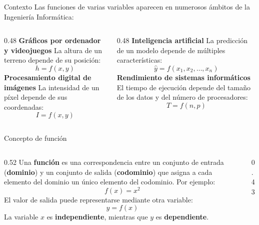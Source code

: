 \documentclass[main.tex]{subfiles}
\begin{document}
\graphicspath{{imagenes/tema1/}{../imagenes/tema1/}}






\begin{frame}{Contexto}
Las funciones de varias variables aparecen en numerosos ámbitos de la Ingeniería Informática:
\vspace{0.4cm}
\begin{columns}[T]
\begin{column}{0.48\textwidth}
\textbf{Gráficos por ordenador y videojuegos}
La altura de un terreno depende de su posición:
\[h=f(x,y)\]
\vspace{0.4cm}
\textbf{Procesamiento digital de imágenes}
La intensidad de un píxel depende de sus coordenadas:
\[I=f(x,y)\]
\end{column}
\begin{column}{0.48\textwidth}
\textbf{Inteligencia artificial}
La predicción de un modelo depende de múltiples características:
\[\hat{y}=f(x_1,x_2,\ldots,x_n)\]
\vspace{0.4cm}
\textbf{Rendimiento de sistemas informáticos}
El tiempo de ejecución depende del tamaño de los datos y del número de procesadores:
\[T=f(n,p)\]
\end{column}
\end{columns}
\end{frame}


\begin{frame}{Concepto de función}
\begin{columns}[c]
\begin{column}{0.52\textwidth}
Una \textbf{función} es una correspondencia entre un conjunto de entrada (\textbf{dominio}) y un conjunto de salida (\textbf{codominio}) que asigna a cada elemento del dominio un único elemento del codominio.
\vspace{0.4cm}
Por ejemplo:
\[f(x)=x^2\]
El valor de salida puede representarse mediante otra variable:
\[y=f(x)\]
La variable $x$ es \textbf{independiente}, mientras que $y$ es \textbf{dependiente}.
\end{column}
\begin{column}{0.43\textwidth}
\centering
{}
\end{column}
\end{columns}
\end{frame}
\end{document}
